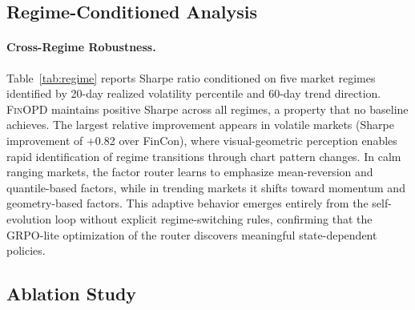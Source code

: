 \subsection{Regime-Conditioned Analysis}



\paragraph{Cross-Regime Robustness.} Table~\ref{tab:regime} reports Sharpe ratio conditioned on five market regimes identified by 20-day realized volatility percentile and 60-day trend direction. \textsc{FinOPD} maintains positive Sharpe across all regimes, a property that no baseline achieves. The largest relative improvement appears in volatile markets (Sharpe improvement of +0.82 over FinCon), where visual-geometric perception enables rapid identification of regime transitions through chart pattern changes. In calm ranging markets, the factor router learns to emphasize mean-reversion and quantile-based factors, while in trending markets it shifts toward momentum and geometry-based factors. This adaptive behavior emerges entirely from the self-evolution loop without explicit regime-switching rules, confirming that the GRPO-lite optimization of the router discovers meaningful state-dependent policies.

\subsection{Ablation Study}



